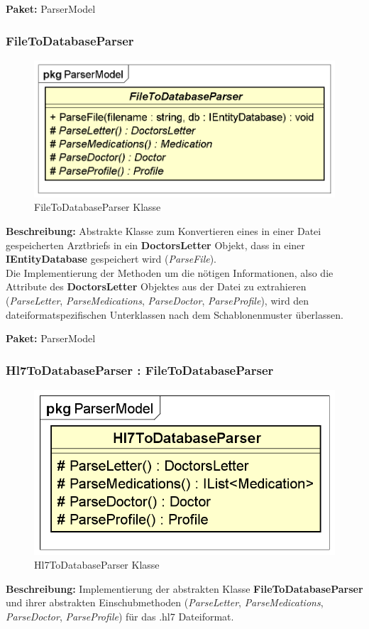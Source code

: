 \documentclass[a4paper]{scrreprt}
\begin{document}
\textbf{Paket:} ParserModel

\subsubsection{FileToDatabaseParser}
\begin{figure}[H]
\centering
\includegraphics[width=0.55\textheight]{graphics/Klassendiagramme/Model/FileToDatabaseParser.png}
\caption{FileToDatabaseParser Klasse}
\end{figure}
\textbf{Beschreibung:} Abstrakte Klasse zum Konvertieren eines in einer Datei gespeicherten Arztbriefs in ein \textbf{DoctorsLetter} Objekt, dass in einer \textbf{IEntityDatabase} gespeichert wird (\textit{ParseFile}).\\
Die Implementierung der Methoden um die nötigen Informationen, also die Attribute des \textbf{DoctorsLetter} Objektes aus der Datei zu extrahieren (\textit{ParseLetter}, \textit{ParseMedications}, \textit{ParseDoctor}, \textit{ParseProfile}), wird den dateiformatspezifischen Unterklassen nach dem Schablonenmuster überlassen.

\textbf{Paket:} ParserModel

\subsubsection{Hl7ToDatabaseParser : FileToDatabaseParser}
\begin{figure}[H]
\centering
\includegraphics[width=0.45\textheight]{graphics/Klassendiagramme/Model/Hl7ToDatabaseParser.png}
\caption{Hl7ToDatabaseParser Klasse}
\end{figure}
\textbf{Beschreibung:} Implementierung der abstrakten Klasse \textbf{FileToDatabaseParser} und ihrer abstrakten Einschubmethoden (\textit{ParseLetter}, \textit{ParseMedications}, \textit{ParseDoctor}, \textit{ParseProfile}) für das .hl7 Dateiformat.
\end{document}
